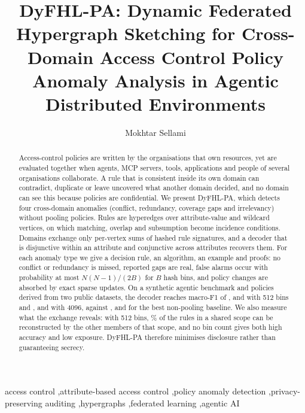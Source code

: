 \documentclass[preprint,12pt]{elsarticle}
\theoremstyle{definition}
\newcommand{\name}{DyFHL-PA\xspace}
\begin{document}
\begin{frontmatter}

\title{DyFHL-PA: Dynamic Federated Hypergraph Sketching for Cross-Domain Access Control Policy Anomaly Analysis in Agentic Distributed Environments}

\author[riadi]{Mokhtar Sellami}
\address[riadi]{RIADI Laboratory, National School of Computer Science (ENSI), University of Manouba, Manouba, Tunisia}

\begin{abstract}
Access-control policies are written by the organisations that own resources, yet are evaluated together when agents, MCP servers, tools, applications and people of several organisations collaborate. A rule that is consistent inside its own domain can contradict, duplicate or leave uncovered what another domain decided, and no domain can see this because policies are confidential. We present \name, which detects four cross-domain anomalies (conflict, redundancy, coverage gaps and irrelevancy) without pooling policies. Rules are hyperedges over attribute-value and wildcard vertices, on which matching, overlap and subsumption become incidence conditions. Domains exchange only per-vertex sums of hashed rule signatures, and a decoder that is disjunctive within an attribute and conjunctive across attributes recovers them. For each anomaly type we give a decision rule, an algorithm, an example and proofs: no conflict or redundancy is missed, reported gaps are real, false alarms occur with probability at most $N(N-1)/(2B)$ for $B$ hash bins, and policy changes are absorbed by exact sparse updates. On a synthetic agentic benchmark and policies derived from two public datasets, the decoder reaches macro-F1 of \mainagenticR, \mainxustollerR{} and \mainamazonR{} with 512 bins and \mainagenticRbig, \mainxustollerRbig{} and \mainamazonRbig{} with 4096, against \mainagenticbest, \mainxustollerbest{} and \mainamazonbest{} for the best non-pooling baseline. We also measure what the exchange reveals: with 512 bins, \lkallBdxii\% of the rules in a shared scope can be reconstructed by the other members of that scope, and no bin count gives both high accuracy and low exposure. \name therefore minimises disclosure rather than guaranteeing secrecy.
\end{abstract}


\begin{keyword}
access control \sep attribute-based access control \sep policy anomaly detection \sep privacy-preserving auditing \sep hypergraphs \sep federated learning \sep agentic AI
\end{keyword}
\end{frontmatter}
\end{document}
